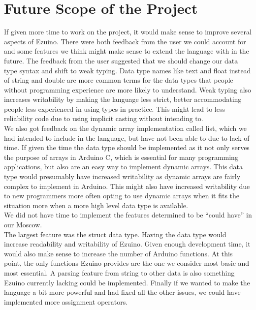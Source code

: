 \chapter{Future Scope of the Project}
If given more time to work on the project, it would make sense to improve several aspects of Ezuino. There were both feedback from the user we could account for and some features we think might make sense to extend the language with in the future.
The feedback from the user suggested that we should change our data type syntax and shift to weak typing. Data type names like text and float instead of string and double are more common terms for the data types that people without programming experience are more likely to understand. Weak typing also increases writability by making the language less strict, better accommodating people less experienced in using types in practice. This might lead to less reliability code due to using implicit casting without intending to. \\
We also got feedback on the dynamic array implementation called list, which we had intended to include in the language, but have not been able to due to lack of time. If given the time the data type should be implemented as it not only serves the purpose of arrays in Arduino C, which is essential for many programming applications, but also are an easy way to implement dynamic arrays. This data type would presumably have increased writability as dynamic arrays are fairly complex to implement in Arduino. This might also have increased writability due to new programmers more often opting to use dynamic arrays when it fits the situation more when a more high level data type is available. \\
We did not have time to implement the features determined to be “could have” in our Moscow. \\
The largest feature was the struct data type. Having the data type would increase readability and writability of Ezuino. Given enough development time, it would also make sense to increase the number of Arduino functions. At this point, the only functions Ezuino provides are the one we consider most basic and most essential. A parsing feature from string to other data is also something Ezuino currently lacking could be implemented. Finally if we wanted to make the language a bit more powerful and had fixed all the other issues, we could have implemented more assignment operators.

